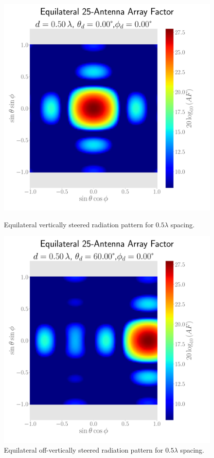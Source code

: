 \begin{figure}[H]
  \begin{minipage}[t]{0.45\textwidth}
    \centering
    \includegraphics[width=\textwidth]{graphics/task_3/equilat-0.50-lambda-0.00-theta-0.00-phi-radpat.pdf}
    \caption{Equilateral vertically steered radiation pattern for $0.5\lambda$ spacing.}\label{fig:rad-equilat-0.5-0}
  \end{minipage}\hfill
  \begin{minipage}[t]{0.45\textwidth}
    \centering
    \includegraphics[width=\textwidth]{graphics/task_3/equilat-0.50-lambda-60.00-theta-0.00-phi-radpat.pdf}
    \caption{Equilateral off-vertically steered radiation pattern for $0.5\lambda$ spacing.}\label{fig:rad-equilat-0.5-60}
   \end{minipage}
\end{figure}


